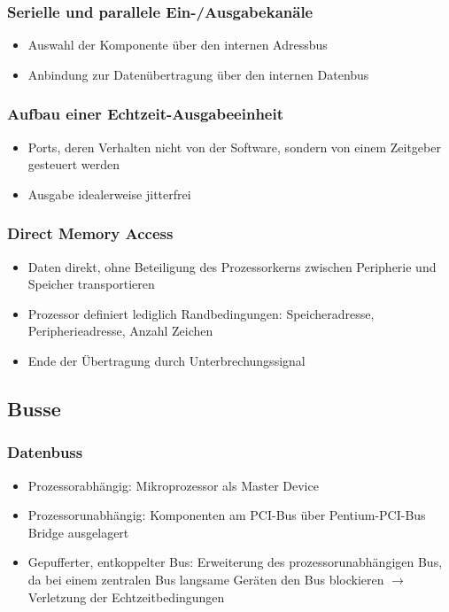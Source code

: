 \subsubsection{Serielle und parallele Ein-/Ausgabekanäle}
\begin{itemize}
	\item Auswahl der Komponente über den internen Adressbus
	\item Anbindung zur Datenübertragung über den internen Datenbus
\end{itemize}

\subsubsection{Aufbau einer Echtzeit-Ausgabeeinheit}
\begin{itemize}
	\item Ports, deren Verhalten nicht von der Software, sondern von einem Zeitgeber gesteuert werden
	\item Ausgabe idealerweise jitterfrei
\end{itemize}

\subsubsection{Direct Memory Access}
\begin{itemize}
	\item Daten direkt, ohne Beteiligung des Prozessorkerns zwischen Peripherie und Speicher transportieren
	\item Prozessor definiert lediglich Randbedingungen: Speicheradresse, Peripherieadresse, Anzahl Zeichen
	\item Ende der Übertragung durch Unterbrechungssignal
\end{itemize}


\subsection{Busse}

\subsubsection{Datenbuss}
\begin{itemize}
	\item Prozessorabhängig: Mikroprozessor als Master Device
	\item Prozessorunabhängig: Komponenten am PCI-Bus über Pentium-PCI-Bus Bridge ausgelagert
	\item Gepufferter, entkoppelter Bus: Erweiterung des prozessorunabhängigen Bus, da bei einem zentralen Bus langsame Geräten den Bus blockieren $\rightarrow$ Verletzung der Echtzeitbedingungen
\end{itemize}

